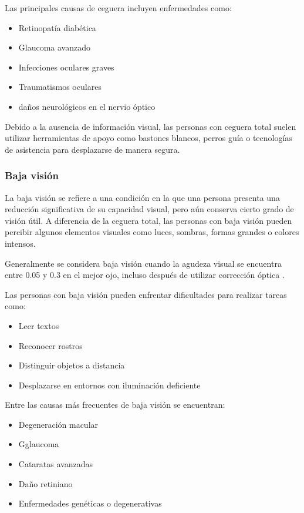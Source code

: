 Las principales causas de ceguera incluyen enfermedades como:
\begin{itemize}
    \item Retinopatía diabética
    \item Glaucoma avanzado
    \item Infecciones oculares graves
    \item Traumatismos oculares
    \item daños neurológicos en el nervio óptico

\end{itemize} \cite{who_blindness2026}

Debido a la ausencia de información visual, las personas con ceguera total suelen utilizar herramientas de apoyo como bastones blancos, perros guía o tecnologías de asistencia para desplazarse de manera segura.

\subsubsection{Baja visión}
La baja visión se refiere a una condición en la que una persona presenta una reducción significativa de su capacidad visual, pero aún conserva cierto grado de visión útil. A diferencia de la ceguera total, las personas con baja visión pueden percibir algunos elementos visuales como luces, sombras, formas grandes o colores intensos.

Generalmente se considera baja visión cuando la agudeza visual se encuentra entre 0.05 y 0.3 en el mejor ojo, incluso después de utilizar corrección óptica \cite{once_bajavision}.

Las personas con baja visión pueden enfrentar dificultades para realizar tareas como:
\begin{itemize}
    \item Leer textos 
    \item Reconocer rostros
    \item Distinguir objetos a distancia
    \item Desplazarse en entornos con iluminación deficiente
\end{itemize}\cite{who_blindness2026}

Entre las causas más frecuentes de baja visión se encuentran:
\begin{itemize}
    \item Degeneración macular
    \item Gglaucoma
    \item Cataratas avanzadas
    \item Daño retiniano
    \item Enfermedades genéticas o degenerativas
\end{itemize}\cite{who_blindness2026}

